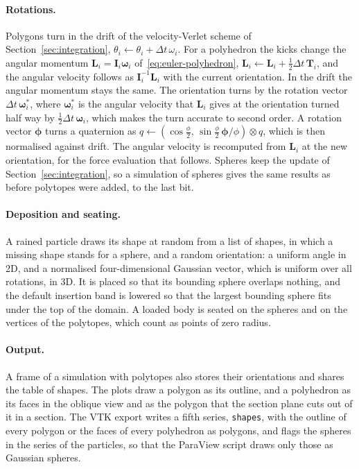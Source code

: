 \paragraph{Rotations.}
Polygons turn in the drift of the velocity-Verlet scheme of Section~\ref{sec:integration}, $\theta_{i}\leftarrow\theta_{i}+\Delta t\,\omega_{i}$.
For a polyhedron the kicks change the angular momentum $\mathbf{L}_{i}=\mathbf{I}_{i}\boldsymbol{\omega}_{i}$ of~\eqref{eq:euler-polyhedron}, $\mathbf{L}_{i}\leftarrow\mathbf{L}_{i}+\tfrac{1}{2}\Delta t\,\mathbf{T}_{i}$, and the angular velocity follows as $\mathbf{I}_{i}^{-1}\mathbf{L}_{i}$ with the current orientation.
In the drift the angular momentum stays the same.
The orientation turns by the rotation vector $\Delta t\,\boldsymbol{\omega}^{*}_{i}$, where $\boldsymbol{\omega}^{*}_{i}$ is the angular velocity that $\mathbf{L}_{i}$ gives at the orientation turned half way by $\tfrac{1}{2}\Delta t\,\boldsymbol{\omega}_{i}$, which makes the turn accurate to second order.
A rotation vector $\boldsymbol{\phi}$ turns a quaternion as $q\leftarrow(\cos\tfrac{\phi}{2},\,\sin\tfrac{\phi}{2}\,\boldsymbol{\phi}/\phi)\otimes q$, which is then normalised against drift.
The angular velocity is recomputed from $\mathbf{L}_{i}$ at the new orientation, for the force evaluation that follows.
Spheres keep the update of Section~\ref{sec:integration}, so a simulation of spheres gives the same results as before polytopes were added, to the last bit.

\paragraph{Deposition and seating.}
A rained particle draws its shape at random from a list of shapes, in which a missing shape stands for a sphere, and a random orientation: a uniform angle in 2D, and a normalised four-dimensional Gaussian vector, which is uniform over all rotations, in 3D.
It is placed so that its bounding sphere overlaps nothing, and the default insertion band is lowered so that the largest bounding sphere fits under the top of the domain.
A loaded body is seated on the spheres and on the vertices of the polytopes, which count as points of zero radius.

\paragraph{Output.}
A frame of a simulation with polytopes also stores their orientations and shares the table of shapes.
The plots draw a polygon as its outline, and a polyhedron as its faces in the oblique view and as the polygon that the section plane cuts out of it in a section.
The VTK export writes a fifth series, \texttt{shapes}, with the outline of every polygon or the faces of every polyhedron as polygons, and flags the spheres in the series of the particles, so that the ParaView script draws only those as Gaussian spheres.

